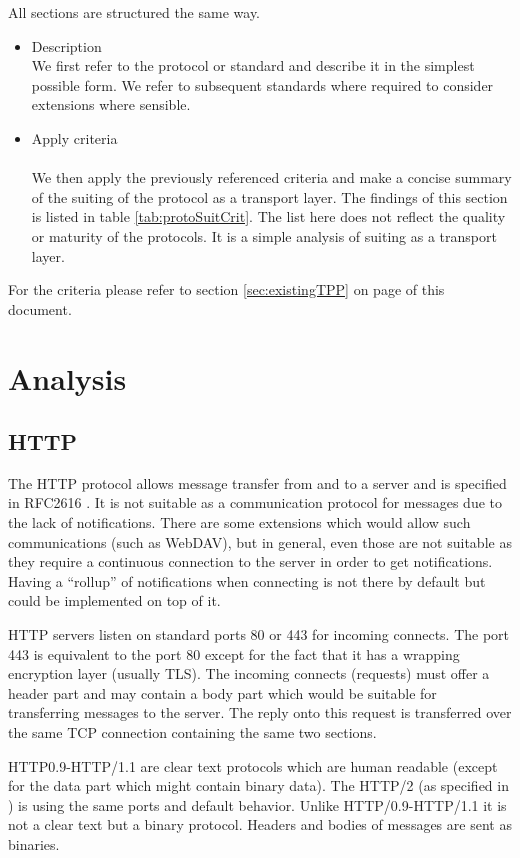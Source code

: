 \documentclass[a4paper,appendixprefix,pdfusetitle,twocolumn,fontsize=8pt,draft,DIV=calc]{scrbook}
\begin{document}
All sections are structured the same way. 
\begin{itemize}
	\item Description\\
	      We first refer to the protocol or standard and describe it in the simplest possible form. We refer to subsequent standards where required to consider extensions where sensible.
	\item Apply criteria\\\\
	      We then apply the previously referenced criteria and make a concise summary of the suiting of the protocol as a transport layer. The findings of this section is listed in table \ref{tab:protoSuitCrit}. The list here does not reflect the quality or maturity of the protocols. It is a simple analysis of suiting as a transport layer.
\end{itemize} 

For the criteria please refer to section \ref{sec:existingTPP} on page \pageref{sec:existingTPP} of this document.

\section{Analysis}
\subsection{HTTP}
The HTTP protocol allows message transfer from and to a server and is specified in RFC2616 \cite{RFC2616}. It is not suitable as a communication protocol for messages due to the lack of notifications. There are some extensions which would allow such communications (such as WebDAV), but in general, even those are not suitable as they require a continuous connection to the server in order to get notifications. Having a ``rollup'' of notifications when connecting is not there by default but could be implemented on top of it. 

HTTP servers listen on standard ports 80 or 443 for incoming connects. The port 443 is equivalent to the port 80 except for the fact that it has a wrapping encryption layer (usually TLS). The incoming connects (requests) must offer a header part and may contain a body part which would be suitable for transferring messages to the server. The reply onto this request is transferred over the same TCP connection containing the same two sections.

HTTP0.9-HTTP/1.1 are clear text protocols which are human readable (except for the data part which might contain binary data). The HTTP/2 (as specified in \cite{RFC7540}) is using the same ports and default behavior. Unlike HTTP/0.9-HTTP/1.1 it is not a clear text but a binary protocol. Headers and bodies of messages are sent as binaries. 
\end{document}
